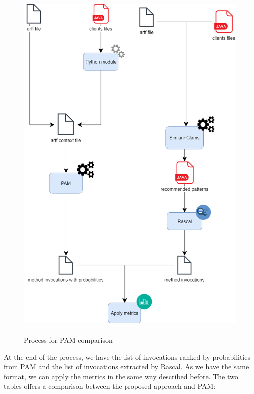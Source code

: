 \begin{figure}[H]
\includegraphics[width=18cm,height=18cm,keepaspectratio]{images/PAM.png}
\centering
  \caption{Process for PAM comparison}
  \label{fig:cmd}
\end{figure}
 At the end of the process, we have the list of invocations ranked by probabilities from PAM and the list of invocations extracted by Rascal. As we have the same format, we can apply the metrics in the same way described before. The two tables offers a comparison between the proposed approach and PAM: 

